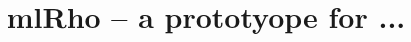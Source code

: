 \documentclass{sig-alternate}
\begin{document}
%

\title{mlRho -- a prototyope for ...}
%
%
%
%
%
\end{document}
